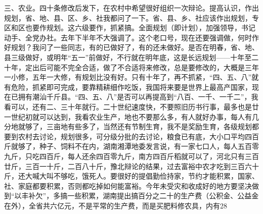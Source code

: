 三、农业。四十条修改后发下，在农村中希望很好组织一次辩论。提高认识，作出规划，省、地、县、区、乡、社我都问了一下。省、县、乡、社应该作出规划，专区和区也要作规划。这六级要作，抓紧搞。全面规划（即计划），加强领导，书记动手、全党办社。去年下半年不大强调了。这个老口号，现在还要强调做，何时作好规划？我问了一些同志，有的已做好了，有的还未做好。是否在明春，省、地、县三级做好，或明年“五一”前做好，不行就在明年底，这是长远规划——十年至二十年，定出后可能不完全合适，做了不合适将来修改，总是要修改的，大概是三年一小修，五年一大修，有规划比没有好。只有十年了，再不抓紧，“四、五、八”就有危险，抓紧即可完成，要靠精耕细作吃饭，我国将来要是世界上最高产国家，现在已拥有潮汕千斤县。“四、五、八”是否可以再提高到“八百、一千、一千二”，我看可以，还有二、三十年就行。二十世纪速度快，不要照旧历书行事，最多也是廿一世纪初就可以达到，我看农业生产，地也不要那么多，有人就好办事，每人有几分地就够了，三亩地有些多了，当然还有节制生育，我不是奖励生育，各级规划都要到农村去讨论，规划很多，可分级分批的去讨论，粮食已有底，大小口平均四百斤就够了，种子、饲料不在内，湖南湘潭地委发言说，有一家七口人，每人五百零九斤，只吃四百斤，每人还余四百零九斤，南方四百斤稻就可以了，河北只有三百廿斤，三百一十斤，二百八十斤，豫北辩论的结果，过去富裕中农才吃到三百六十斤，还大喊大叫不够吃，饿死人。要很好的提倡勤俭持家，节约才能积累，国家、社、家庭都要积累，否则都吃掉如何能富裕。今年未受灾和收成好的地方要坚决做到“以丰补欠”，多搞一些积累，湖南提出搞百分之二十的生产费（公积金、公益金在外），全省共六亿元，不是平常的生产费，而是买肥料修农具，内有28%


